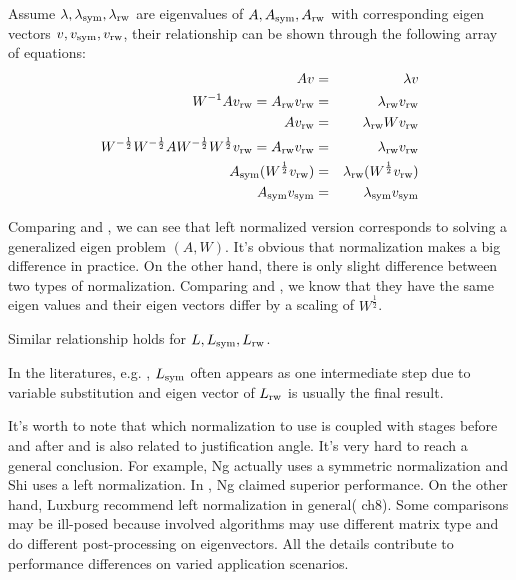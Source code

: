 
Assume $ \lambda, \lambda_{\text{sym}}, \lambda_{\text{rw}} $ are eigenvalues
of $ A, A_{\text{sym}}, A_{\text{rw}} $ with corresponding eigen vectors 
$ v, v_{\text{sym}}, v_{\text{rw}} $, their relationship can be shown through 
the following array of equations:
\begin{eqnarray}
	Av &=& \lambda v \label{eq:eiga}\\
	W^{-1} A v_{\text{rw}} = A_{\text{rw}} v_{\text{rw}} &=& \lambda_{\text{rw}} v_{\text{rw}} \\
	A v_{\text{rw}} &=& \lambda_{\text{rw}} Wv_{\text{rw}} \label{eq:eigarw1}\\
	W^{-\frac{1}{2}} W^{-\frac{1}{2}} A 
	W^{-\frac{1}{2}} W^{\frac{1}{2}} v_{\text{rw}}
	= A_{\text{rw}} v_{\text{rw}} 
	&=& \lambda_{\text{rw}} v_{\text{rw}} \\
	A_{\text{sym}}(W^{\frac{1}{2}} v_{\text{rw}}) &=& 
	\lambda_{\text{rw}}(W^{\frac{1}{2}} v_{\text{rw}}) \label{eq:eigarw2}\\
	A_{\text{sym}} v_{\text{sym}} &=& \lambda_{\text{sym}} v_{\text{sym}} \label{eq:eigasym}
\end{eqnarray}

Comparing \req{\ref{eq:eiga}} and \req{\ref{eq:eigarw1}}, we can see that 
left normalized version corresponds to solving a generalized eigen
problem $ (A, W) $. It's obvious that normalization makes a big difference 
in practice. On the other hand, there is only slight difference 
between two types of normalization. 
Comparing \req{\ref{eq:eigarw2}} and \req{\ref{eq:eigasym}}, 
we know that they have the same eigen values and their eigen vectors
differ by a scaling of $ W^{\frac{1}{2}} $. 

Similar relationship holds for $ L, L_{\text{sym}}, L_{\text{rw}} $. 

In the literatures, e.g. \cite{belkin2003laplacian}
\cite{shi2000normalized}, $ L_{\text{sym}} $ often appears as 
one intermediate step due to variable substitution and 
eigen vector of $ L_{\text{rw}} $ is usually the final result. 

It's worth to note that which normalization to use is 
coupled with stages before and after
and is also related to justification angle. It's very hard to 
reach a general conclusion. For example, Ng\cite{ng2002spectral}
actually uses a symmetric normalization and Shi\cite{shi2000normalized}
uses a left normalization. In \cite{ng2002spectral}, Ng 
claimed superior performance. On the other hand, Luxburg
recommend left normalization in general(\cite{von2007tutorial} ch8). 
Some comparisons may be ill-posed because involved algorithms 
may use different matrix type and do different post-processing 
on eigenvectors. All the details contribute to performance 
differences on varied application scenarios. 

